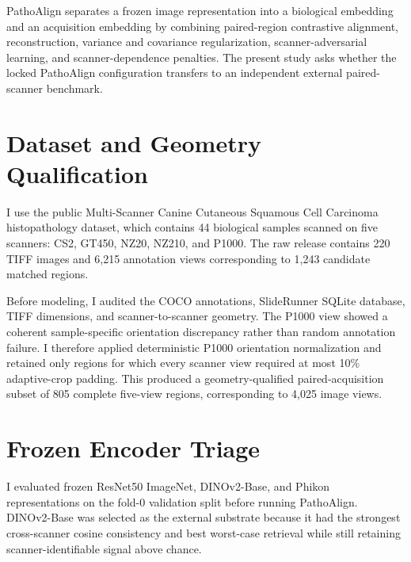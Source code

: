 \documentclass[10pt]{article}
\begin{document}
PathoAlign separates a frozen image representation into a biological embedding and an acquisition embedding by combining paired-region contrastive alignment, reconstruction, variance and covariance regularization, scanner-adversarial learning, and scanner-dependence penalties. The present study asks whether the locked PathoAlign configuration transfers to an independent external paired-scanner benchmark.

\section{Dataset and Geometry Qualification}

I use the public Multi-Scanner Canine Cutaneous Squamous Cell Carcinoma histopathology dataset, which contains 44 biological samples scanned on five scanners: CS2, GT450, NZ20, NZ210, and P1000. The raw release contains 220 TIFF images and 6,215 annotation views corresponding to 1,243 candidate matched regions.

Before modeling, I audited the COCO annotations, SlideRunner SQLite database, TIFF dimensions, and scanner-to-scanner geometry. The P1000 view showed a coherent sample-specific orientation discrepancy rather than random annotation failure. I therefore applied deterministic P1000 orientation normalization and retained only regions for which every scanner view required at most 10\% adaptive-crop padding. This produced a geometry-qualified paired-acquisition subset of 805 complete five-view regions, corresponding to 4,025 image views.

\section{Frozen Encoder Triage}

I evaluated frozen ResNet50 ImageNet, DINOv2-Base, and Phikon representations on the fold-0 validation split before running PathoAlign. DINOv2-Base was selected as the external substrate because it had the strongest cross-scanner cosine consistency and best worst-case retrieval while still retaining scanner-identifiable signal above chance.
\end{document}
